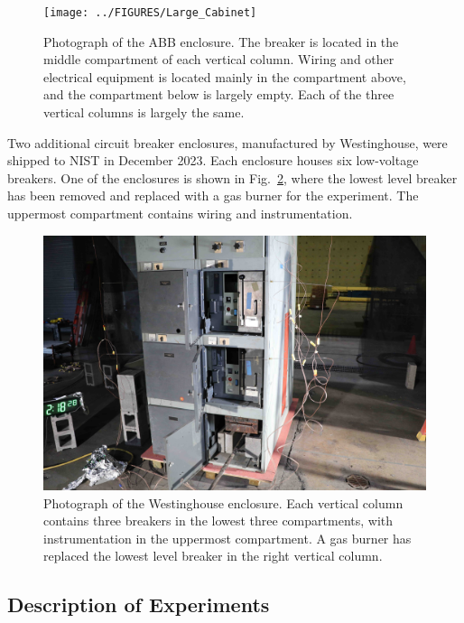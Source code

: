 \begin{figure}[ht]
\centering
\texttt{[image: ../FIGURES/Large\_Cabinet]}
\caption[Photograph of ABB enclosure] {Photograph of the ABB enclosure. The breaker is located in the middle compartment of each vertical column. Wiring and other electrical equipment is located mainly in the compartment above, and the compartment below is largely empty. Each of the three vertical columns is largely the same.}
\label{fig:Cabinet_1}
\end{figure}

Two additional circuit breaker enclosures, manufactured by Westinghouse, were shipped to NIST in December 2023. Each enclosure houses six low-voltage breakers. One of the enclosures is shown in Fig.~\ref{fig:Cabinet_2}, where the lowest level breaker has been removed and replaced with a gas burner for the experiment. The uppermost compartment contains wiring and instrumentation.

\begin{figure}[ht]
\centering
\includegraphics[width=\textwidth]{../FIGURES/Westinghouse}
\caption[Photograph of Westinghouse enclosure] {Photograph of the Westinghouse enclosure. Each vertical column contains three breakers in the lowest three compartments, with instrumentation in the uppermost compartment. A gas burner has replaced the lowest level breaker in the right vertical column.}
\label{fig:Cabinet_2}
\end{figure}

\subsection{Description of Experiments}

